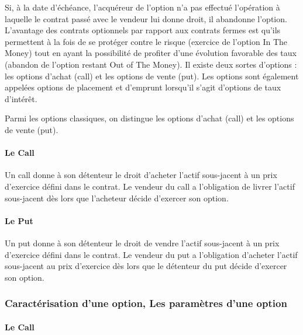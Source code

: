 \documentclass[a4paper, 12pt]{report}
\begin{document}
Si, à la date d’échéance, l’acquéreur de l’option n’a pas effectué l’opération à laquelle le contrat passé avec le vendeur lui donne droit, il abandonne l’option. L’avantage des contrats optionnels par rapport aux contrats fermes est qu’ils permettent à la fois de se protéger contre le risque (exercice de l’option In The Money) tout en ayant la possibilité de profiter d’une évolution favorable des taux (abandon de l’option restant Out of The Money). Il existe deux sortes d’options : les options d’achat (call) et les options de vente (put). Les options sont également appelées options de placement et d’emprunt lorsqu’il s’agit d’options de taux d’intérêt.

Parmi les options classiques, on distingue les options d’achat (call) et les options de vente (put).

\paragraph{Le Call} 

Un call donne à son détenteur le droit d’acheter l’actif sous-jacent à un prix d’exercice défini dans le contrat. Le vendeur du call a l’obligation de livrer l’actif sous-jacent dès lors que l’acheteur décide d’exercer son option.

\paragraph{Le Put}

Un put donne à son détenteur le droit de vendre l’actif sous-jacent à un prix d’exercice défini dans le contrat. Le vendeur du put a l’obligation d’acheter l’actif sous-jacent au prix d’exercice dès lors que le détenteur du put décide d’exercer son option.

\subsubsection{Caractérisation d’une option, Les paramètres d’une option}

\paragraph{Le Call}
\end{document}
